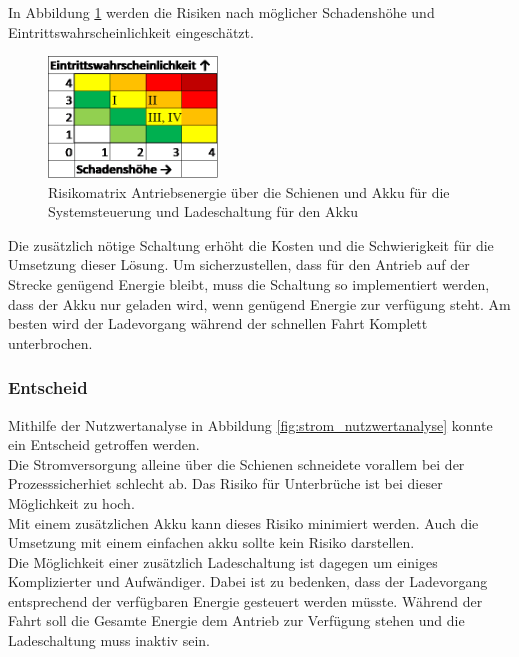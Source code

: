 \documentclass[../../main.tex]{subfiles}
\begin{document}
    In Abbildung \ref{fig:strom_risikomatrix_akku_mitladung} werden die Risiken nach möglicher Schadenshöhe und Eintrittswahrscheinlichkeit eingeschätzt.

    \begin{figure}[H]
        \centering
        \includegraphics[width=0.4\textwidth]{Strom_Risiko_Akku_Ladung.png}
        \caption {Risikomatrix Antriebsenergie über die Schienen und Akku für die Systemsteuerung und Ladeschaltung für den Akku}
        \label{fig:strom_risikomatrix_akku_mitladung}
    \end{figure}

    Die zusätzlich nötige Schaltung erhöht die Kosten und die Schwierigkeit für die Umsetzung dieser Lösung. Um sicherzustellen, dass für den Antrieb auf der Strecke genügend Energie bleibt, muss die Schaltung so implementiert werden, dass der Akku nur geladen wird, wenn genügend Energie zur verfügung steht. Am besten wird der Ladevorgang während der schnellen Fahrt Komplett unterbrochen.

    
    \subsubsection{Entscheid}
    Mithilfe der Nutzwertanalyse in Abbildung \ref{fig:strom_nutzwertanalyse} konnte ein Entscheid getroffen werden.\\
    Die Stromversorgung alleine über die Schienen schneidete vorallem bei der Prozesssicherhiet schlecht ab. Das Risiko für Unterbrüche ist bei dieser Möglichkeit zu hoch.\\
    Mit einem zusätzlichen Akku kann dieses Risiko  minimiert werden. Auch die Umsetzung mit einem einfachen akku sollte kein Risiko darstellen.\\
    Die Möglichkeit einer zusätzlich Ladeschaltung ist dagegen um einiges Komplizierter und Aufwändiger. Dabei ist zu bedenken, dass der Ladevorgang entsprechend der verfügbaren Energie gesteuert werden müsste. Während der Fahrt soll die Gesamte Energie dem Antrieb zur Verfügung stehen und die Ladeschaltung muss inaktiv sein.
        
\end{document}
